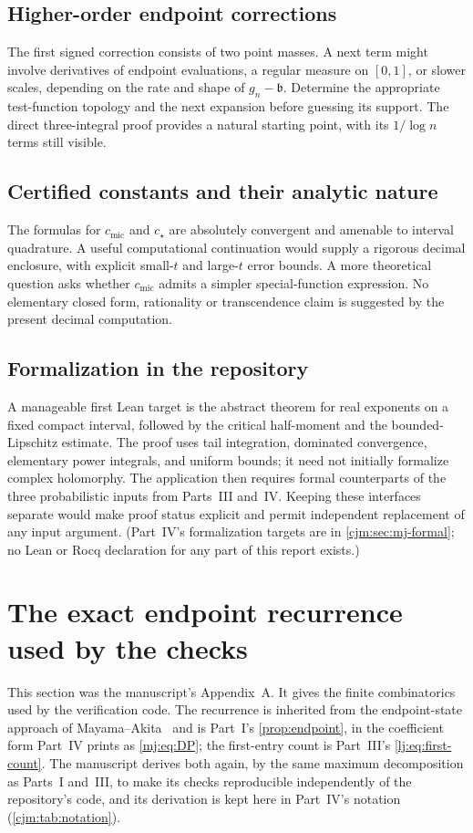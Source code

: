 \documentclass[11pt,a4paper]{article}
\theoremstyle{definition}\newaliascnt{definition}{theorem}
\theoremstyle{remark}\newaliascnt{remark}{theorem}
\newcommand{\cjmic}{c_{\mathrm{mic}}}
\begin{document}
\subsection{Higher-order endpoint corrections}
The first signed correction consists of two point masses. A next term
might involve derivatives of endpoint evaluations, a regular measure on
$[0,1]$, or slower scales, depending on the rate and shape of
$g_n-\mathfrak b$. Determine the appropriate test-function topology and the
next expansion before guessing its support. The direct three-integral proof
provides a natural starting point, with its $1/\log n$ terms still visible.

\subsection{Certified constants and their analytic nature}
The formulas for $\cjmic$ and $c_\star$ are absolutely convergent and
amenable to interval quadrature. A useful computational continuation would
supply a rigorous decimal enclosure, with explicit small-$t$ and large-$t$
error bounds. A more theoretical question asks whether $\cjmic$ admits a
simpler special-function expression. No elementary closed form, rationality
or transcendence claim is suggested by the present decimal computation.

\subsection{Formalization in the repository}
\label{pr:sec:cjm-formal}
A manageable first Lean target is the abstract theorem for real exponents
on a fixed compact interval, followed by the critical half-moment and the
bounded-Lipschitz estimate. The proof uses tail integration, dominated
convergence, elementary power integrals, and uniform bounds; it need not
initially formalize complex holomorphy. The application then requires
formal counterparts of the three probabilistic inputs from Parts~III
and~IV. Keeping these interfaces separate would make proof status explicit
and permit independent replacement of any input argument. (Part~IV's
formalization targets are in \cref{cjm:sec:mj-formal}; no Lean or Rocq
declaration for any part of this report exists.)

\section{The exact endpoint recurrence used by the checks}
\label{cjm:app:recurrence}
This section was the manuscript's Appendix~A. It gives the finite
combinatorics used by the verification code. The recurrence is inherited
from the endpoint-state approach of Mayama--Akita~\cite{MayamaAkita} and is
Part~I's \cref{prop:endpoint}, in the coefficient form Part~IV prints as
\eqref{mj:eq:DP}; the first-entry count is Part~III's
\eqref{lj:eq:first-count}. The manuscript derives both again, by the same
maximum decomposition as Parts~I and~III, to make its checks reproducible
independently of the repository's code, and its derivation is kept here in
Part~IV's notation (\cref{cjm:tab:notation}).
\end{document}
